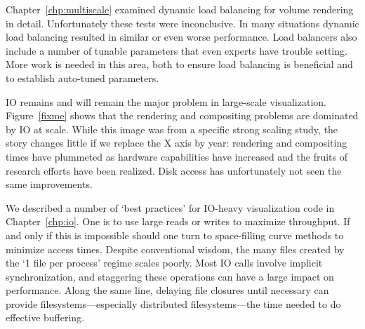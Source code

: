 Chapter~\ref{chp:multiscale} examined dynamic load balancing for volume
rendering in detail.  Unfortunately these tests were inconclusive.  In
many situations dynamic load balancing resulted in similar or even
worse performance.  Load balancers also include a number of tunable
parameters that even experts have trouble setting.  More work is needed
in this area, both to ensure load balancing is beneficial and to
establish auto-tuned parameters.






IO remains and will remain the major problem in large-scale
visualization.  Figure~\ref{fixme} shows that the rendering and
compositing problems are dominated by IO at scale.  While this image
was from a specific strong scaling study, the story changes little if
we replace the X axis by year: rendering and compositing times have
plummeted as hardware capabilities have increased and the fruits of
research efforts have been realized.  Disk access has unfortunately not
seen the same improvements.

We described a number of `best practices' for IO-heavy visualization
code in Chapter~\ref{chp:io}.  One is to use large reads or writes to
maximize throughput.  If and only if this is impossible should one
turn to space-filling curve methods to minimize access times.  Despite
conventional wisdom, the many files created by the `1 file per process'
regime scales poorly.  Most IO calls involve implicit synchronization,
and staggering these operations can have a large impact on performance.
Along the same line, delaying file closures until necessary can provide
filesystems---especially distributed filesystems---the time needed to
do effective buffering.

